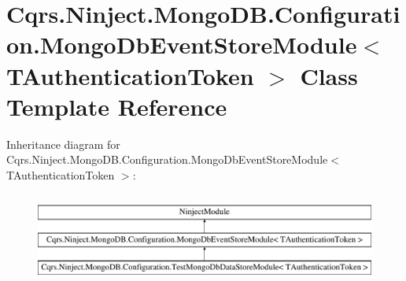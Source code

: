 \hypertarget{classCqrs_1_1Ninject_1_1MongoDB_1_1Configuration_1_1MongoDbEventStoreModule}{}\section{Cqrs.\+Ninject.\+Mongo\+D\+B.\+Configuration.\+Mongo\+Db\+Event\+Store\+Module$<$ T\+Authentication\+Token $>$ Class Template Reference}
\label{classCqrs_1_1Ninject_1_1MongoDB_1_1Configuration_1_1MongoDbEventStoreModule}
Inheritance diagram for Cqrs.\+Ninject.\+Mongo\+D\+B.\+Configuration.\+Mongo\+Db\+Event\+Store\+Module$<$ T\+Authentication\+Token $>$\+:\begin{figure}[H]
\begin{center}
\leavevmode
\includegraphics[height=3.000000cm]{classCqrs_1_1Ninject_1_1MongoDB_1_1Configuration_1_1MongoDbEventStoreModule}
\end{center}
\end{figure}

